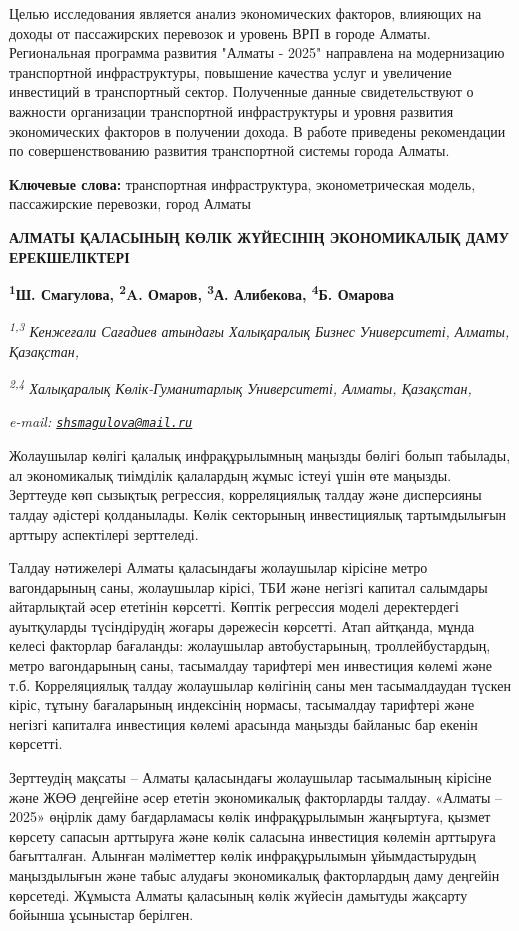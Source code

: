 Целью исследования является анализ экономических факторов, влияющих на
доходы от пассажирских перевозок и уровень ВРП в городе Алматы.
Региональная программа развития "Алматы - 2025" направлена на
модернизацию транспортной инфраструктуры, повышение качества услуг и
увеличение инвестиций в транспортный сектор. Полученные данные
свидетельствуют о важности организации транспортной инфраструктуры и
уровня развития экономических факторов в получении дохода. В работе
приведены рекомендации по совершенствованию развития транспортной
системы города Алматы.

{\bfseries Ключевые слова:} транспортная инфраструктура, эконометрическая
модель, пассажирские перевозки, город Алматы

{\bfseries АЛМАТЫ ҚАЛАСЫНЫҢ КӨЛІК ЖҮЙЕСІНІҢ ЭКОНОМИКАЛЫҚ ДАМУ
ЕРЕКШЕЛІКТЕРІ}

{\bfseries \textsuperscript{1}Ш. Смагулова\textsuperscript{\envelope },
\textsuperscript{2}A. Омаров, \textsuperscript{3}А. Алибекова,
\textsuperscript{4}Б. Омарова}

\emph{\textsuperscript{1,3} Кенжеғали Сағадиев атындағы Халықаралық
Бизнес Университеті, Алматы, Қазақстан,}

\emph{\textsuperscript{2,4} Халықаралық Көлік-Гуманитарлық Университеті,
Алматы, Қазақстан,}

\emph{e-mail:
\href{mailto:shsmagulova@mail.ru}{\nolinkurl{shsmagulova@mail.ru}}}

Жолаушылар көлігі қалалық инфрақұрылымның маңызды бөлігі болып табылады,
ал экономикалық тиімділік қалалардың жұмыс істеуі үшін өте маңызды.
Зерттеуде көп сызықтық регрессия, корреляциялық талдау және дисперсияны
талдау әдістері қолданылады. Көлік секторының инвестициялық
тартымдылығын арттыру аспектілері зерттеледі.

Талдау нәтижелері Алматы қаласындағы жолаушылар кірісіне метро
вагондарының саны, жолаушылар кірісі, ТБИ және негізгі капитал салымдары
айтарлықтай әсер ететінін көрсетті. Көптік регрессия моделі деректердегі
ауытқуларды түсіндірудің жоғары дәрежесін көрсетті. Атап айтқанда, мұнда
келесі факторлар бағаланды: жолаушылар автобустарының, троллейбустардың,
метро вагондарының саны, тасымалдау тарифтері мен инвестиция көлемі және
т.б. Корреляциялық талдау жолаушылар көлігінің саны мен тасымалдаудан
түскен кіріс, тұтыну бағаларының индексінің нормасы, тасымалдау
тарифтері және негізгі капиталға инвестиция көлемі арасында маңызды
байланыс бар екенін көрсетті.

Зерттеудің мақсаты -- Алматы қаласындағы жолаушылар тасымалының кірісіне
және ЖӨӨ деңгейіне әсер ететін экономикалық факторларды талдау. «Алматы
-- 2025» өңірлік даму бағдарламасы көлік инфрақұрылымын жаңғыртуға,
қызмет көрсету сапасын арттыруға және көлік саласына инвестиция көлемін
арттыруға бағытталған. Алынған мәліметтер көлік инфрақұрылымын
ұйымдастырудың маңыздылығын және табыс алудағы экономикалық факторлардың
даму деңгейін көрсетеді. Жұмыста Алматы қаласының көлік жүйесін дамытуды
жақсарту бойынша ұсыныстар берілген.

